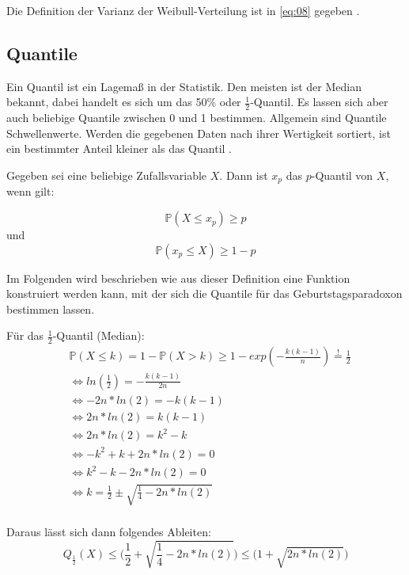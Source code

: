 \documentclass[../main.tex]{subfiles}
\begin{document}
\begin{flushleft}
Die Definition der Varianz der Weibull-Verteilung ist in \ref{eq:08} gegeben \cite{rinne}.

 \subsection{Quantile}

Ein Quantil ist ein Lagemaß in der Statistik. Den meisten ist der Median bekannt, dabei handelt es sich um das 50\% oder $\frac{1}{2}$-Quantil. Es lassen sich aber auch beliebige Quantile zwischen 0 und 1 bestimmen. Allgemein sind Quantile Schwellenwerte. Werden die gegebenen Daten nach ihrer Wertigkeit sortiert, ist ein bestimmter Anteil kleiner als das Quantil \cite[32,35,37]{henze}. \newline

Gegeben sei eine beliebige Zufallsvariable $X$. Dann ist $x_{p}$ das $p$-Quantil von $X$, wenn gilt:

\begin{equation}
\mathbb{P}(X \leq x_p) \geq p
\end{equation}
und
\begin{equation}
\mathbb{P}( x_p \leq X ) \geq 1- p
\end{equation}

Im Folgenden wird beschrieben wie aus dieser Definition eine Funktion konstruiert werden kann, mit der sich die Quantile für das Geburtstagsparadoxon bestimmen lassen. \newline

Für das  $\frac{1}{2}$-Quantil (Median):
\begin{align*}
& \mathbb{P}(X \leq k) = 1 - \mathbb{P}(X > k) \geq 1 - exp(-\frac{ k(k-1) }{ n }) \overset{!}{=} \frac{ 1 }{ 2 } \\
& \Leftrightarrow ln(\frac{ 1 }{ 2 }) = -\frac{ k(k-1)}{ 2n } \\
& \Leftrightarrow -2n*ln(2) = -k(k-1) \\
& \Leftrightarrow 2n*ln(2) = k(k-1) \\
& \Leftrightarrow 2n*ln(2) = k^{2} - k \\
& \Leftrightarrow - k^{2} + k + 2n*ln(2) = 0 \\
& \Leftrightarrow k^{2} - k - 2n*ln(2) = 0 \\
& \Leftrightarrow k = \frac{ 1 }{ 2 } \pm \sqrt{ \frac{ 1 }{ 4 } - 2n*ln(2)} \\
\end{align*}

Daraus lässt sich dann folgendes Ableiten:
\begin{equation}
Q_{ \frac{ 1 }{ 2 } }(X) \leq \bigg( \frac{ 1 }{ 2 } + \sqrt{ \frac{ 1 }{ 4 } - 2n*ln(2)} \bigg) \leq \bigg(1+\sqrt{ 2n*ln(2) }\bigg)
\end{equation}
\newline


\end{flushleft}
\end{document}
